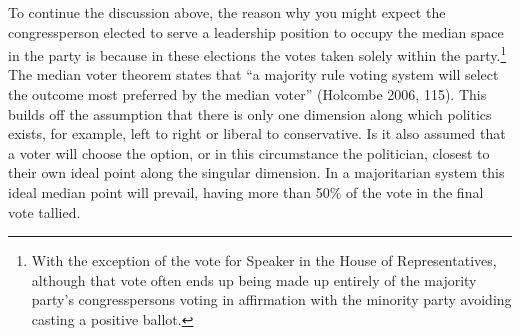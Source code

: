 \documentclass[12pt,twoside]{reedthesis}
\begin{document}
  To continue the discussion above, the reason why you might expect the
  congressperson elected to serve a leadership position to occupy the
  median space in the party is because in these elections the votes taken
  solely within the party.\footnote{With the exception of the vote for
    Speaker in the House of Representatives, although that vote often ends
    up being made up entirely of the majority party's congresspersons
    voting in affirmation with the minority party avoiding casting a
    positive ballot.} The median voter theorem states that ``a majority
  rule voting system will select the outcome most preferred by the median
  voter'' (Holcombe 2006, 115). This builds off the assumption that there
  is only one dimension along which politics exists, for example, left to
  right or liberal to conservative. Is it also assumed that a voter will
  choose the option, or in this circumstance the politician, closest to
  their own ideal point along the singular dimension. In a majoritarian
  system this ideal median point will prevail, having more than 50\% of
  the vote in the final vote tallied.
  
\end{document}
